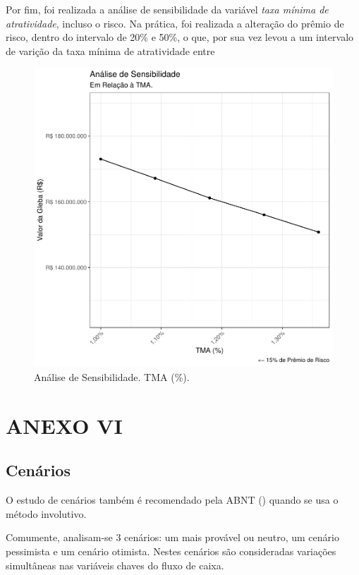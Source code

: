 \documentclass[
  10pt,
  a4paper]{article}
\begin{document}
Por fim, foi realizada a análise de sensibilidade da variável \emph{taxa
mínima de atratividade}, incluso o risco. Na prática, foi realizada a
alteração do prêmio de risco, dentro do intervalo de 20\% e 50\%, o que,
por sua vez levou a um intervalo de varição da taxa mínima de
atratividade entre

\begin{figure}[H]

{\centering \includegraphics[width=0.7\linewidth]{images/SensTMA-1} 

}

\caption{Análise de Sensibilidade. TMA (\%).}\label{fig:SensTMA}
\end{figure}

\newpage

\section*{ANEXO VI}\label{anexo-vi}

\subsection*{Cenários}\label{cenuxe1rios}

O estudo de cenários também é recomendado pela ABNT
() quando se usa o método involutivo.

Comumente, analisam-se 3 cenários: um mais provável ou neutro, um
cenário pessimista e um cenário otimista. Nestes cenários são
consideradas variações simultâneas nas variáveis chaves do fluxo de
caixa.
\end{document}
